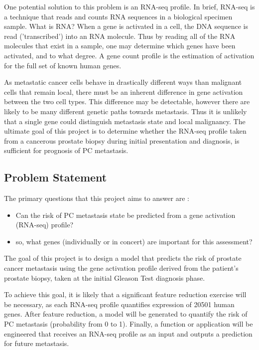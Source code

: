 \documentclass[final]{article}
\begin{document}
One potential solution to this problem is an RNA-seq profile.  In brief, RNA-seq
is a technique that reads and counts RNA sequences in a biological specimen
sample.  What is RNA?   When a gene is activated in a cell, the DNA sequence is
read ('transcribed') into an RNA molecule.  Thus by reading all of the RNA
molecules that exist in a sample, one may determine which genes have been
activated, and to what degree.  A gene count profile is the estimation of
activation for the full set of known human genes.

As metastatic cancer cells behave in drastically different ways than malignant
cells that remain local, there must be an inherent difference in gene activation
between the two cell types.   This difference may be detectable, however there
are likely to be many different genetic paths towards metastasis. Thus it is
unlikely that a single gene could distinguish metastasis state and local
malignancy. The ultimate goal of this project is to determine whether the
RNA-seq profile taken from a cancerous prostate biopsy during initial
presentation and diagnosis, is  sufficient for prognosis of PC
metastasis.

\subsection{Problem Statement}

The primary questions that this project aims to answer are :
\begin{itemize}
\item Can the risk of PC metastasis state be predicted from a gene activation (RNA-seq) profile?
\item so, what genes (individually or in concert) are important for this assessment?
\end{itemize}

The goal of this project is to design a model that predicts the risk of prostate
cancer metastasis using the gene activation profile derived from the patient's
prostate biopsy, taken at the initial Gleason Test diagnosis phase.

To achieve this goal, it is likely that a  significant feature reduction
exercise will be necessary, as each  RNA-seq profile quantifies expression of
20501 human genes.  After feature reduction, a model will be generated to
quantify the risk of PC metastasis (probability from 0 to 1).
Finally, a function or application will be engineered that receives an RNA-seq
profile as an input and outputs a prediction for future metastasis.
\end{document}
